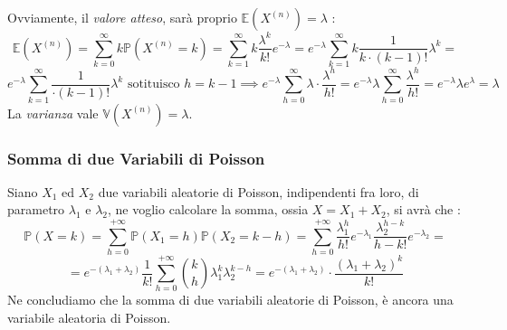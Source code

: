 \documentclass[12pt, letterpaper]{article}
\newcommand{\E}{{\mathbb E}}
\newcommand{\V}{{\mathbb V}}
\newcommand{\Prob}{{\mathbb P}}
\begin{document}
Ovviamente, il \textit{valore atteso}, sarà proprio  \(\E(X^{(n)})=\lambda\) : \begin{equation}
    \E(X^{(n)})=\sum_{k=0}^\infty k\Prob(X^{(n)}=k)=\sum_{k=1}^\infty k\dfrac{\lambda^k}{k!}e^{-\lambda}=e^{-\lambda}\sum_{k=1}^\infty k\dfrac{1}{k\cdot(k-1)!}\lambda^k
=\end{equation}\begin{equation}
    e^{-\lambda}\sum_{k=1}^\infty \dfrac{1}{\cdot(k-1)!}\lambda^k \text{ sotituisco }h=k-1\implies e^{-\lambda}\sum_{h=0}^\infty\lambda\cdot\dfrac{\lambda^h}{h!}=
    e^{-\lambda}\lambda\sum_{h=0}^\infty\dfrac{\lambda^h}{h!}=e^{-\lambda}\lambda e^{\lambda}=\lambda
\end{equation}
La \textit{varianza} vale \(\V(X^{(n)})=\lambda\).
\subsubsection{Somma di due Variabili di Poisson}
Siano \(X_1\) ed \(X_2\) due variabili aleatorie di Poisson, indipendenti fra loro, di parametro \(\lambda_1\) e \(\lambda_2\),
ne voglio calcolare la somma, ossia \(X=X_1+X_2\), si avrà che : \begin{equation}
    \Prob(X=k)=\sum_{h=0}^{+\infty}\Prob(X_1=h)\Prob(X_2=k-h)=\sum_{h=0}^{+\infty}\dfrac{\lambda_1^h}{h!}e^{-\lambda_1}\dfrac{\lambda_2^{h-k}}{{h-k}!}e^{-\lambda_2}=
\end{equation}
\begin{equation}
    =e^{-(\lambda_1+\lambda_2)}\dfrac{1}{k!}\sum_{h=0}^{+\infty}\binom{k}{h}\lambda_1^k\lambda_2^{k-h}=e^{-(\lambda_1+\lambda_2)}\cdot\dfrac{(\lambda_1+\lambda_2)^k}{k!}
\end{equation}
Ne concludiamo che la somma di due variabili aleatorie di Poisson, è ancora una variabile aleatoria di Poisson.
\end{document}
